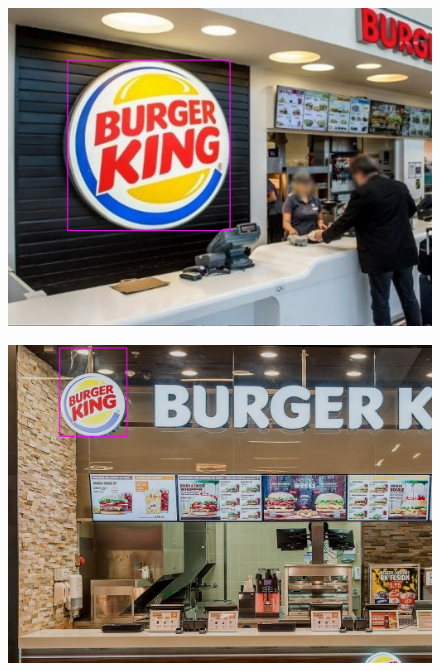 \begin{figure}[h]
    \centering
    \includegraphics[width=\columnwidth]{figures/results/bk3.jpg}
    \label{fig:result3}
\end{figure}

\begin{figure}[b]
    \centering
    \includegraphics[width=\columnwidth]{figures/results/bk4.jpg}
    \label{fig:result4}
\end{figure}

